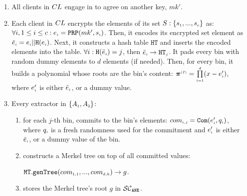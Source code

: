 \begin{enumerate}[leftmargin=4mm]
\item\label{e-psi::gen-mk-prime} All clients in ${CL}$ engage in \ct to agree on another key, $mk'$.
%
\item\label{Smart-PSI:encode-elem} Each client  in ${CL}$ encrypts the elements of its set $S:\{ s_{\scriptscriptstyle 1},..., s_{\scriptscriptstyle c}\}$ as: $\forall i, 1\leq i\leq c: e_{\scriptscriptstyle i}=\mathtt{PRP}(mk', s_{\scriptscriptstyle i})$. 
%
Then, it encodes its encrypted set element as $\bar{e}_{\scriptscriptstyle i} =e_{\scriptscriptstyle i} || \mathtt{H}(e_{\scriptscriptstyle i})$.  
%
Next, it constructs a hash table  $\mathtt{HT}$ and inserts the encoded elements into the table. $\forall i: \mathtt{H}( \bar{e}_{\scriptscriptstyle i})={ {  {j}}}$, then $\bar{e}_{\scriptscriptstyle i}\rightarrow \mathtt{HT}_{\scriptscriptstyle {  {j}}}$. It pads every bin with random dummy elements to $d$ elements (if needed). Then,  for every bin, it builds a polynomial whose roots are the bin's content: $\bm\pi^{\scriptscriptstyle { {(I)}}}=\prod\limits^{\scriptscriptstyle d}_{\scriptscriptstyle i=1} (x-e'_{\scriptscriptstyle i})$, where $e'_{\scriptscriptstyle i}$ is either $\bar{e}_{\scriptscriptstyle i}$, or a dummy value. 




\item\label{merkel-tree-cons} Every extractor in $\{A_{\scriptscriptstyle 1}, A_{\scriptscriptstyle 2}\}$: 

\begin{enumerate}
%
%
\item\label{smart-PSI::commit-to-bin} for each $j$-th bin, commits to the bin's elements: $com_{\scriptscriptstyle{i,j}}=\mathtt{Com}(e'_{\scriptscriptstyle i}, q_{\scriptscriptstyle i})$, where $q_{\scriptscriptstyle i}$ is a fresh randomness  used for the commitment and $e'_{\scriptscriptstyle i}$ is either $\bar{e}_{\scriptscriptstyle i}$, or a dummy value of the bin. %




\item  constructs a Merkel tree on top of all committed values: 

$\mathtt{MT.genTree}(com_{\scriptscriptstyle 1,1},...,com_{\scriptscriptstyle d,h})\rightarrow g$. %
\item stores the Merkel tree's root $g$ in $\mathcal{SC}_{\mathtt{ANE}}$.
\end{enumerate}



\end{enumerate}
